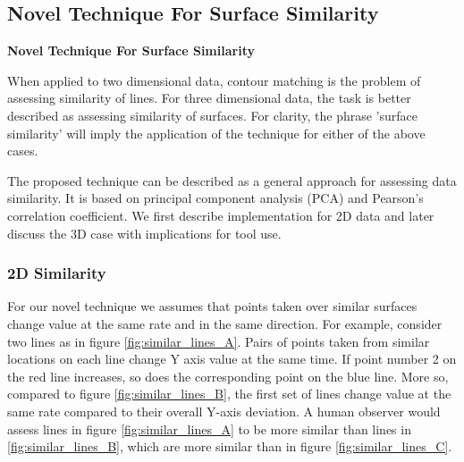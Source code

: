 \documentclass[11]{article}
\let \shorttitle \textbf
\begin{document}
\pagebreak[0]
\subsection{Novel Technique For Surface Similarity}

\shorttitle{Novel Technique For Surface Similarity}

When applied to two dimensional data, contour matching is the problem of assessing similarity of lines. 
For three dimensional data, the task is better described as assessing similarity of surfaces.
For clarity, the phrase 'surface similarity' will imply the application of the technique for either of the above cases.  

The proposed technique can be described as a general approach for assessing data similarity. 
It is based on principal component analysis (PCA) and Pearson's correlation coefficient. 
We first describe implementation for 2D data and later discuss the 3D case with implications for tool use.  

\subsubsection{2D Similarity}
For our novel technique we assumes that points taken over similar surfaces change value at the same rate and in the same direction. 
For example, consider two lines as in figure \ref{fig:similar_lines_A}. Pairs of points taken from similar locations on each line change Y axis value at the same time. 
If point number 2 on the red line increases, so does the corresponding point on the blue line.   
More so, compared to figure \ref{fig:similar_lines_B}, the first set of lines change value at the same rate compared to their overall Y-axis deviation.
A human observer would assess lines in figure \ref{fig:similar_lines_A} to be more similar than lines in \ref{fig:similar_lines_B},
which are more similar than in figure \ref{fig:similar_lines_C}.
\end{document}
